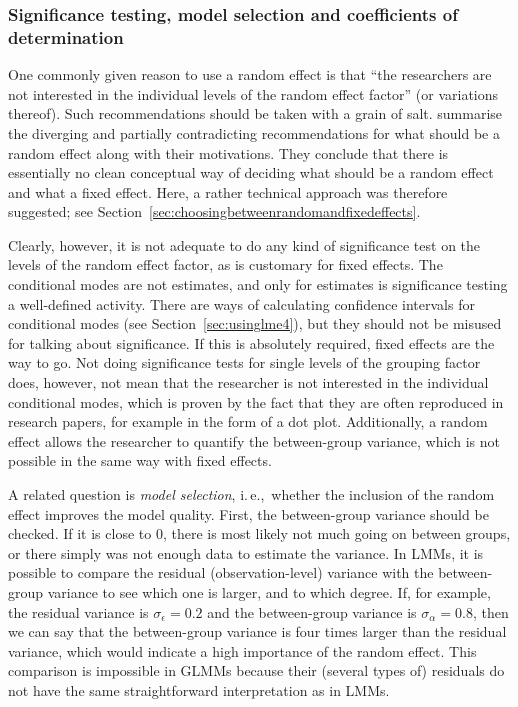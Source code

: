 \documentclass[a4paper,12pt]{article}
\newcommand{\ie}{i.\,e.,\ }
\begin{document}
\subsubsection{Significance testing, model selection and coefficients of determination}
\label{sec:significancetestingandcoefficientsofdetermination}

One commonly given reason to use a random effect is that ``the researchers are not interested in the individual levels of the random effect factor'' (or variations thereof).
Such recommendations should be taken with a grain of salt.
\citet[245--247]{GelmanHill2006} summarise the diverging and partially contradicting recommendations for what should be a random effect along with their motivations.
They conclude that there is essentially no clean conceptual way of deciding what should be a random effect and what a fixed effect.
Here, a rather technical approach was therefore suggested; see Section~\ref{sec:choosingbetweenrandomandfixedeffects}.

Clearly, however, it is not adequate to do any kind of significance test on the levels of the random effect factor, as is customary for fixed effects.
The conditional modes are not estimates, and only for estimates is significance testing a well-defined activity.
There are ways of calculating confidence intervals for conditional modes (see Section~\ref{sec:usinglme4}), but they should not be misused for talking about significance.
If this is absolutely required, fixed effects are the way to go.
Not doing significance tests for single levels of the grouping factor does, however, not mean that the researcher is not interested in the individual conditional modes, which is proven by the fact that they are often reproduced in research papers, for example in the form of a dot plot.
Additionally, a random effect allows the researcher to quantify the between-group variance, which is not possible in the same way with fixed effects.

A related question is \textit{model selection}, \ie whether the inclusion of the random effect improves the model quality.
First, the between-group variance should be checked.
If it is close to $0$, there is most likely not much going on between groups, or there simply was not enough data to estimate the variance.
In LMMs, it is possible to compare the residual (observation-level) variance with the between-group variance to see which one is larger, and to which degree.
If, for example, the residual variance is $\sigma_{\epsilon}=0.2$ and the between-group variance is $\sigma_{\alpha}=0.8$, then we can say that the between-group variance is four times larger than the residual variance, which would indicate a high importance of the random effect.
This comparison is impossible in GLMMs because their (several types of) residuals do not have the same straightforward interpretation as in LMMs.
\end{document}
